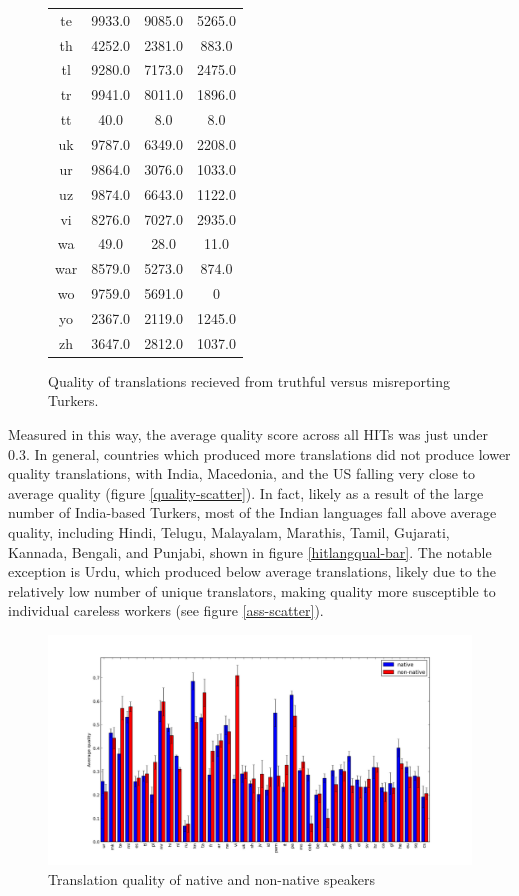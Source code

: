 \documentclass[11pt]{article}
\begin{document}
\begin{figure}[h]
\begin{tabular}{cccc}
te&9933.0&9085.0&5265.0\\
th&4252.0&2381.0&883.0\\
tl&9280.0&7173.0&2475.0\\
tr&9941.0&8011.0&1896.0\\
tt&40.0&8.0&8.0\\
uk&9787.0&6349.0&2208.0\\
ur&9864.0&3076.0&1033.0\\
uz&9874.0&6643.0&1122.0\\
vi&8276.0&7027.0&2935.0\\
wa&49.0&28.0&11.0\\
war&8579.0&5273.0&874.0\\
wo&9759.0&5691.0&0\\
yo&2367.0&2119.0&1245.0\\
zh&3647.0&2812.0&1037.0\\
\hline\hline
\end{tabular}
\label{mism-tab}
\caption{Quality of translations recieved from truthful versus misreporting Turkers.}
\end{figure}

Measured in this way, the average quality score across all HITs was just under 0.3. In general, countries which produced more translations did not produce lower quality translations, with India, Macedonia, and the US falling very close to average quality (figure \ref{quality-scatter}). In fact, likely as a result of the large number of India-based Turkers, most of the Indian languages fall above average quality, including Hindi, Telugu, Malayalam, Marathis, Tamil, Gujarati, Kannada, Bengali, and Punjabi, shown in figure \ref{hitlangqual-bar}. The notable exception is Urdu, which produced below average translations, likely due to the relatively low number of unique translators, making quality more susceptible to individual careless workers (see figure \ref{ass-scatter}). 


\begin{figure}[h]
\centering
\includegraphics[width=6in]{figures/quality-natlang-sorted}
\caption{Translation quality of native and non-native speakers}
\label{natlangqual-bar}
\end{figure}
\end{document}
